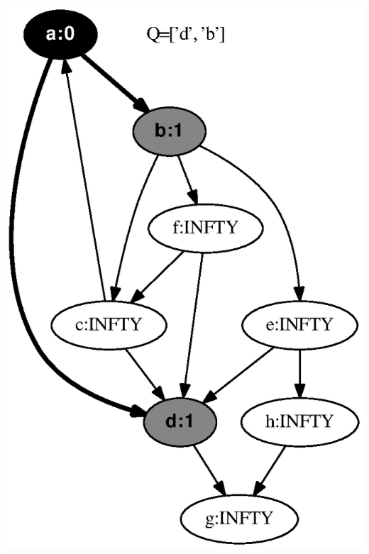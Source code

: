 \documentclass{article}
\begin{document}
\includegraphics[height=.3\textheight]{bfs_directed_classroom_01.eps}
\vspace{1em}
\end{document}
